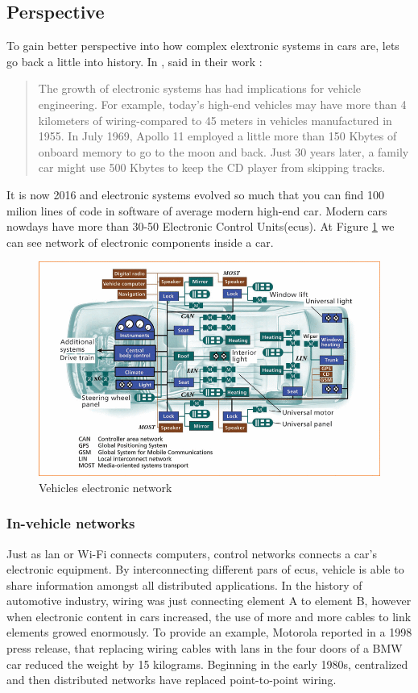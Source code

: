 \subsection{Perspective} %
\label{sub:perspective}
To gain better perspective into how complex elextronic systems in cars are, lets go back a little into history. In \citeyear{976923}, \citeauthor{976923} said in their work :
\blockquote[\cite{976923}]{The growth of electronic systems has had implications for vehicle engineering. For example, today's high-end vehicles may have more than 4 kilometers of wiring-compared to 45 meters in vehicles manufactured in 1955. In July 1969, Apollo 11 employed a little more than 150 Kbytes of onboard memory to go to the moon and back. Just 30 years later, a family car might use 500 Kbytes to keep the CD player from skipping tracks.}
It is now 2016 and electronic systems evolved so much that you can find 100 milion lines of code in software of average modern high-end car\cite{lines_of_code}. Modern cars nowdays have more than 30-50 Electronic Control Units(\glspl{ecu}). At Figure \ref{fig:car_system} we can see network of electronic components inside a car.
\begin{figure}[H]
\begin{center}
\captionsetup{font=small}
\includegraphics[scale=0.5]{pics/car_system.png}
\caption{Vehicles electronic network}
\label{fig:car_system}
\end{center}
\end{figure}
\subsubsection{In-vehicle networks} %
\label{ssub:in_vehicle_networks}
Just as \gls{lan} or Wi-Fi connects computers, control networks connects a car's electronic equipment. By interconnecting different pars of \glspl{ecu}, vehicle is able to share information amongst all distributed applications. In the history of automotive industry, wiring was just connecting element A to element B, however when electronic content in cars increased, the use of more and more cables to link elements growed enormously. To provide an example, Motorola reported in a 1998 press release, that replacing wiring cables with \gls{lan}s in the four doors of a BMW car reduced the weight by 15 kilograms. Beginning in the early 1980s, centralized and then distributed networks have replaced point-to-point wiring.\cite{815878}
